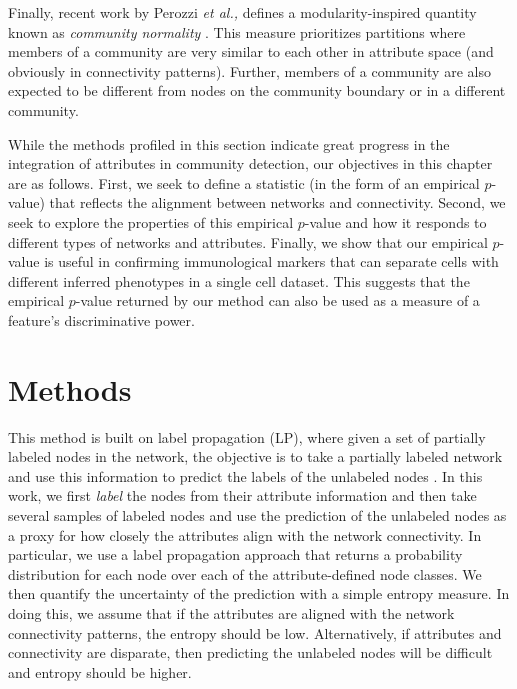 Finally, recent work by Perozzi \emph{et al.,} defines a modularity-inspired quantity known as \emph{community normality} \cite{perozziAttribute}. This measure prioritizes partitions where members of a community are very similar to each other in attribute space (and obviously in connectivity patterns). Further, members of a community are also expected to be different from nodes on the community boundary or in a different community. 

While the methods profiled in this section indicate great progress in the integration of attributes in community detection, our objectives in this chapter are as follows. First, we seek to define a statistic (in the form of an empirical $p$-value) that reflects the alignment between networks and connectivity. Second, we seek to explore the properties of this empirical $p$-value and how it responds to different types of networks and attributes. Finally, we show that our empirical $p$-value is useful in confirming immunological markers that can separate cells with different inferred phenotypes in a single cell dataset. This suggests that the empirical $p$-value returned by our method can also be used as a measure of a feature's discriminative power. 

\section{Methods}
This method is built on label propagation (LP), where given a set of partially labeled nodes in the network, the objective is to take a partially labeled network and use this information to predict the labels of the unlabeled nodes \cite{LabProp}. In this work, we first \emph{label} the nodes from their attribute information and then take several samples of labeled nodes and use the prediction of the unlabeled nodes as a proxy for how closely the attributes align with the network connectivity. In particular, we use a label propagation approach that returns a probability distribution for each node over each of the attribute-defined node classes. We then quantify the uncertainty of the prediction with a simple entropy measure. In doing this, we assume that if the attributes are aligned with the network connectivity patterns, the entropy should be low. Alternatively, if attributes and connectivity are disparate, then predicting the unlabeled nodes will be difficult and entropy should be higher. 


